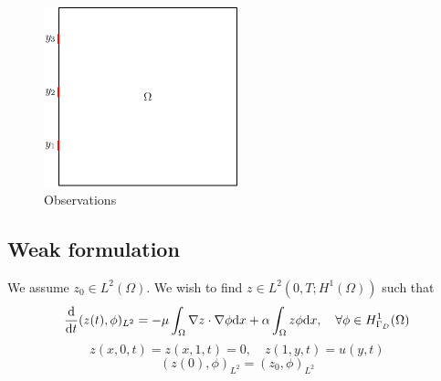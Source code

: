 \documentclass[12pt]{article}
\begin{document}
\begin{figure}
\begin{center}
\includegraphics[width=0.5\textwidth]{heat2d_obs}
\caption{Observations}
\end{center}
\end{figure}
\subsection{Weak formulation}
We assume $z_0 \in L^2(\Omega)$. We wish to find $z \in L^2(0,T;H^1(\Omega))$ such that
\[
 \frac{\textrm{d} }{\textrm{d} t}(z(t), \phi)_{L^2} = - \mu \int_\Omega \nabla z \cdot \nabla \phi \textrm{d} x +  \alpha \int_\Omega z \phi \textrm{d} x, \quad \forall \phi \in H^1_{\Gamma_D}(\Omega)
\]
\[
z(x,0,t) = z(x,1,t) = 0, \quad z(1,y,t) = u(y,t)
\]
\[
 (z(0),\phi)_{L^2} = (z_0 ,\phi)_{L^2}
\]
\end{document}
